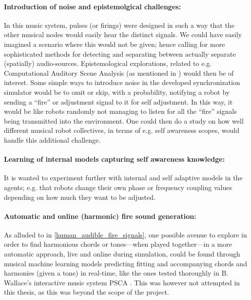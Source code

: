 	\paragraph{Introduction of noise and epistemolgical challenges:}
	In this music system, pulses (or firings) were designed in such a way that the other musical nodes would easily hear the distinct signals. We could have easily imagined a scenario where this would not be given; hence calling for more sophisticated methods for detecting and separating between actually separate (spatially) audio-sources. Epistemological explorations, related to e.g. Computational Auditory Scene Analysis (as mentioned in \cite{casa}) would then be of interest. Some simple ways to introduce noise in the developed synchronization simulator would be to omit or skip, with a probability, notifying a robot by sending a ``fire'' or adjustment signal to it for self adjustment. In this way, it would be like robots randomly not managing to listen for all the ``fire'' signals being transmitted into the environment. One could then do a study on how well different musical robot collectives, in terms of e.g. self awareness scopes, would handle this additional challenge.
	
	\paragraph{Learning of internal models capturing self awareness knowledge:}
	
	It is wanted to experiment further with internal and self adaptive models in the agents; e.g. that robots change their own phase or frequency coupling values depending on how much they want to be adjusted.
	

	\paragraph{Automatic and online (harmonic) fire sound generation:}
	As alluded to in \ref{human_audible_fire_signals}, one possible avenue to explore in order to find harmonious chords or tones—when played together—in a more automatic approach, live and online during simulation, could be found through musical machine learning models predicting fitting and accompanying chords and harmonies (given a tone) in real-time, like the ones tested thoroughly in B. Wallace's interactive music system PSCA \cite{wallace_PSCA}. This was however not attempted in this thesis, as this was beyond the scope of the project.

